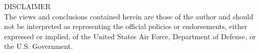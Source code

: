 \vspace*{4cm}
\setcounter{page}{4}
\begin{center}
DISCLAIMER\\

The views and conclusions contained herein are those of the author and should not be interpreted as representing the official policies or endorsements, either expressed or implied, of the United States Air Force, Department of Defense, or the U.S. Government. 

\end{center}
\clearpage

